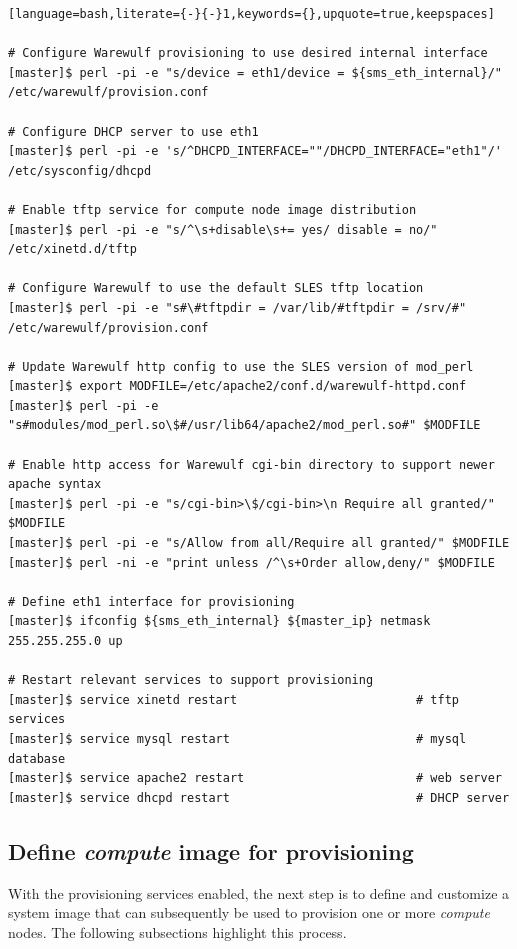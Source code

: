 \documentclass[letterpaper]{article}
\begin{document}
\begin{lstlisting}[language=bash,literate={-}{-}1,keywords={},upquote=true,keepspaces]

# Configure Warewulf provisioning to use desired internal interface
[master]$ perl -pi -e "s/device = eth1/device = ${sms_eth_internal}/" /etc/warewulf/provision.conf

# Configure DHCP server to use eth1
[master]$ perl -pi -e 's/^DHCPD_INTERFACE=""/DHCPD_INTERFACE="eth1"/' /etc/sysconfig/dhcpd

# Enable tftp service for compute node image distribution
[master]$ perl -pi -e "s/^\s+disable\s+= yes/ disable = no/" /etc/xinetd.d/tftp

# Configure Warewulf to use the default SLES tftp location
[master]$ perl -pi -e "s#\#tftpdir = /var/lib/#tftpdir = /srv/#" /etc/warewulf/provision.conf

# Update Warewulf http config to use the SLES version of mod_perl
[master]$ export MODFILE=/etc/apache2/conf.d/warewulf-httpd.conf
[master]$ perl -pi -e "s#modules/mod_perl.so\$#/usr/lib64/apache2/mod_perl.so#" $MODFILE

# Enable http access for Warewulf cgi-bin directory to support newer apache syntax
[master]$ perl -pi -e "s/cgi-bin>\$/cgi-bin>\n Require all granted/" $MODFILE
[master]$ perl -pi -e "s/Allow from all/Require all granted/" $MODFILE
[master]$ perl -ni -e "print unless /^\s+Order allow,deny/" $MODFILE

# Define eth1 interface for provisioning
[master]$ ifconfig ${sms_eth_internal} ${master_ip} netmask 255.255.255.0 up

# Restart relevant services to support provisioning
[master]$ service xinetd restart                         # tftp services
[master]$ service mysql restart                          # mysql database
[master]$ service apache2 restart                        # web server
[master]$ service dhcpd restart                          # DHCP server
\end{lstlisting}


\subsection{Define {\em compute} image for provisioning}

With the provisioning services enabled, the next step is to define and
customize a system image that can subsequently be used to provision one or more
{\em compute} nodes. The following subsections highlight this process.
\end{document}

